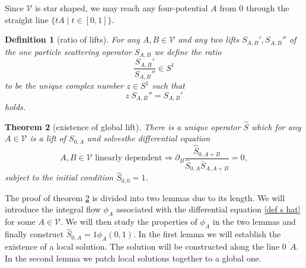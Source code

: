 \documentclass[b5paper,draft,openbib,12pt]{memoir}
\newtheorem{Def}{Definition}
\newtheorem{Thm}[Def]{Theorem}
\begin{document}
Since \(\mathcal{V}\) is star shaped, we may reach any four-potential \(A\) from \(0\) through the straight line
\(\{t A\mid t \in [0,1]\}\). 

\begin{Def}[ratio of lifts]\label{def:ratio}
For any  \(A,B\in\mathcal{V}\) and any two lifts \(S_{A,B}', S_{A,B}''\) of the one particle scattering operator \(S_{A,B}\)
we define the ratio
\begin{equation}
\frac{S_{A,B}'}{S_{A,B}''}\in S^1
\end{equation}
to be the unique complex number \(z\in S^1\) such that 
\begin{equation}
z ~S_{A,B}'' = S_{A,B}'
\end{equation}
holds.
\end{Def}

\begin{Thm}[existence of global lift]\label{thm: ex s hat}
There is a unique operator \(\hat{S}\) which for any  \(A\in\mathcal{V}\) is a lift of \(S_{0,A}\) and solvesthe differential equation
\begin{equation}\label{def s hat}
A,B\in\mathcal{V}\text{ linearly dependent}\Rightarrow \partial_B \frac{\hat{S}_{0,A+B}}{\hat{S}_{0,A}\overline{S}_{A,A+B}}=0,
\end{equation}
subject to the initial condition \(\hat{S}_{0,0}=1\).
\end{Thm}

The proof of theorem \ref{thm: ex s hat} is divided into two lemmas due to its length. We will introduce the integral flow \(\phi_A\) associated 
with the differential equation \eqref{def s hat} for some \(A\in\mathcal{V}\). We will then study the properties of \(\phi_A\)
in the two lemmas and finally construct \(\hat{S}_{0,A}=1 \phi_A(0,1)\). In the first lemma we will establish the existence of a 
local solution. The solution will be constructed along the line \(\overline{0 ~~ A}\). In the second lemma we patch local solutions together
to a global one.
\end{document}
